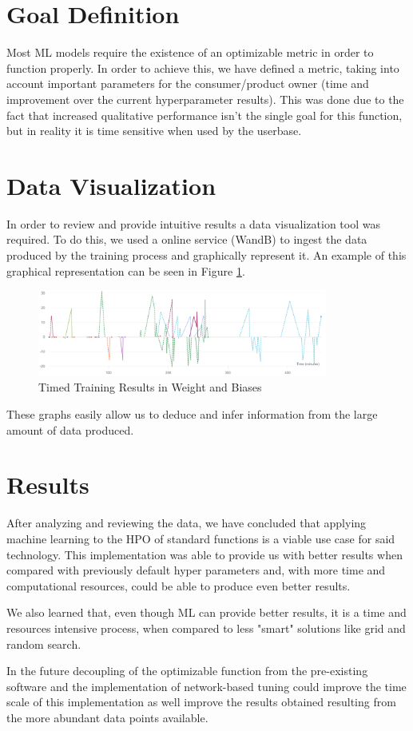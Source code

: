 \documentclass[runningheads]{llncs}
\begin{document}
\section{Goal Definition}

Most ML models require the existence of an optimizable metric in order to function properly. In order to achieve this, we have defined a metric, taking into account important parameters for the consumer/product owner (time and improvement over the current hyperparameter results). This was done due to the fact that increased qualitative performance isn't the single goal for this function, but in reality it is time sensitive when used by the userbase.

\section{Data Visualization}

In order to review and provide intuitive results a data visualization tool was required. To do this, we used a online service (WandB) to ingest the data produced by the training process and graphically represent it. An example of this graphical representation can be seen in Figure \ref{fig:wandb}.

\begin{figure}[htb]
	\centering
	\includegraphics[width=0.85\textwidth]{images/timed_timeline.png}
	\caption{Timed Training Results in Weight and Biases}
	\label{fig:wandb}
\end{figure}

These graphs easily allow us to deduce and infer information from the large amount of data produced.

\section{Results}

After analyzing and reviewing the data, we have concluded that applying machine learning to the HPO of standard functions is a viable use case for said technology. This implementation was able to provide us with better results when compared with previously default hyper parameters and, with more time and computational resources, could be able to produce even better results.

We also learned that, even though ML can provide better results, it is a time and resources intensive process, when compared to less "smart" solutions like grid and random search.

In the future decoupling of the optimizable function from the pre-existing software and the implementation of network-based tuning could improve the time scale of this implementation as well improve the results obtained resulting from the more abundant data points available.



\end{document}

